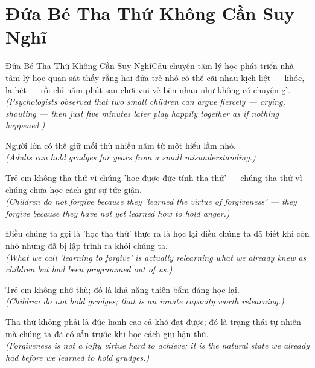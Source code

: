 \section{Đứa Bé Tha Thứ Không Cần Suy Nghĩ}
\begin{truyen}{Đứa Bé Tha Thứ Không Cần Suy Nghĩ}{Câu chuyện tâm lý học phát triển}
 nhà tâm lý học quan sát thấy rằng hai đứa trẻ nhỏ có thể cãi nhau kịch liệt --- khóc, la hét --- rồi chỉ năm phút sau chơi vui vẻ bên nhau như không có chuyện gì.\\[4pt]
\textit{(Psychologists observed that two small children can argue fiercely --- crying, shouting --- then just five minutes later play happily together as if nothing happened.)}

Người lớn có thể giữ mối thù nhiều năm từ một hiểu lầm nhỏ.\\[4pt]
\textit{(Adults can hold grudges for years from a small misunderstanding.)}

Trẻ em không tha thứ vì chúng 'học được đức tính tha thứ' --- chúng tha thứ vì chúng chưa học cách giữ sự tức giận.\\[4pt]
\textit{(Children do not forgive because they 'learned the virtue of forgiveness' --- they forgive because they have not yet learned how to hold anger.)}

Điều chúng ta gọi là 'học tha thứ' thực ra là học lại điều chúng ta đã biết khi còn nhỏ nhưng đã bị lập trình ra khỏi chúng ta.\\[4pt]
\textit{(What we call 'learning to forgive' is actually relearning what we already knew as children but had been programmed out of us.)}

Trẻ em không nhớ thù; đó là khả năng thiên bẩm đáng học lại.\\[4pt]
\textit{(Children do not hold grudges; that is an innate capacity worth relearning.)}

\end{truyen}
\begin{baihoc}
  Tha thứ không phải là đức hạnh cao cả khó đạt được; đó là trạng thái tự nhiên mà chúng ta đã có sẵn trước khi học cách giữ hận thù.\\[4pt]
  \textit{(Forgiveness is not a lofty virtue hard to achieve; it is the natural state we already had before we learned to hold grudges.)}
\end{baihoc}

